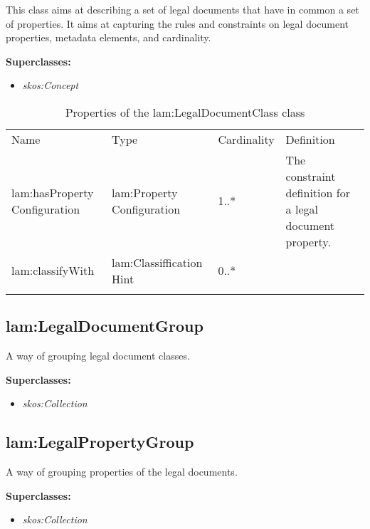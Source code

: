 This class aims at describing a set of legal documents that have in
common a set of properties. It aims at capturing the rules and
constraints on legal document properties, metadata elements, and
cardinality.

\textbf{Superclasses:}

\begin{itemize}
\itemsep1pt\parskip0pt
\item
  \emph{skos:Concept}
\end{itemize}

{
	\footnotesize
	\selectfont%
	\begin{longtable}[c]{@{}p{3cm}p{3cm}p{2cm}p{5.8cm}@{}}
		\toprule\addlinespace
		Name & Type & Cardinality & Definition
		\\\addlinespace
		\midrule\endhead
		lam:hasProperty​Configuration​ & lam:Property​Configuration​ & 1..*​ &
		The constraint definition for a legal document property. ​
		\\\addlinespace
		lam:classify​With​ & lam:Classiffication​Hint​ & 0..*​ &
		\\\addlinespace
		\bottomrule
		\addlinespace
		\caption{Properties of the lam:LegalDocumentClass class}
	\end{longtable}
}

\subsection{lam:LegalDocumentGroup}

A way of grouping legal document classes.

\textbf{Superclasses:}

\begin{itemize}
\itemsep1pt\parskip0pt
\item
  \emph{skos:Collection}
\end{itemize}

\subsection{lam:LegalPropertyGroup}

A way of grouping properties of the legal documents.

\textbf{Superclasses:}

\begin{itemize}
\itemsep1pt\parskip0pt
\item
  \emph{skos:Collection}
\end{itemize}

